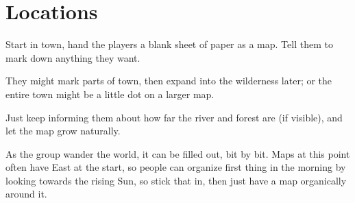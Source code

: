 \chapter{Locations}

\begin{multicols}{2}

Start in \gls{town}, hand the players a blank sheet of paper as a map.
Tell them to mark down anything they want.

They might mark parts of \gls{town}, then expand into the wilderness later; or the entire town might be a little dot on a larger map.

Just keep informing them about how far the river and forest are (if visible), and let the map grow naturally.

As the group wander the world, it can be filled out, bit by bit.
Maps at this point often have East at the start, so people can organize first thing in the morning by looking towards the rising Sun, so stick that in, then just have a map organically around it.

\end{multicols}
